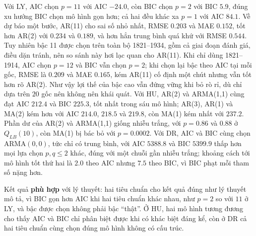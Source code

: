  Với LY, AIC chọn $p=11$ với AIC $-24.0$, còn BIC chọn $p=2$ với BIC $5.9$, đúng xu hướng BIC chọn mô hình gọn hơn; cả hai đều khác xa $p=1$ với AIC $84.1$. Về dự báo một bước, AR(11) cho sai số nhỏ nhất, RMSE $0.203$ và MAE $0.152$, tốt hơn AR(2) với $0.234$ và $0.189$, và hơn hẳn trung bình quá khứ với RMSE $0.544$. Tuy nhiên bậc 11 được chọn trên toàn bộ 1821--1934, gồm cả giai đoạn đánh giá, điều  dặn tránh, nên so sánh này hơi lạc quan cho AR(11). Khi chỉ dùng 1821--1914, AIC chọn $p=12$ và BIC vẫn chọn $p=2$; khi chọn lại bậc theo AIC tại mỗi gốc, RMSE là $0.209$ và MAE $0.165$, kém AR(11) cố định một chút nhưng vẫn tốt hơn rõ AR(2). Như vậy lợi thế của bậc cao vẫn đứng vững khi bỏ rò rỉ, dù chỉ dựa trên $20$ gốc nên không nên khái quát. Với HU, AR(2) và ARMA(1,1) cùng đạt AIC $212.4$ và BIC $225.3$, tốt nhất trong sáu mô hình; AR(3), AR(1) và MA(2) kém hơn với AIC $214.0$, $218.5$ và $219.8$, còn MA(1) kém nhất với $237.2$. Phần dư của AR(2) và ARMA(1,1) giống nhiễu trắng, với $p=0.86$ và $0.88$ ở $Q_{LB}(10)$, còn MA(1) bị bác bỏ với $p=0.0002$. Với DR, AIC và BIC cùng chọn ARMA$(0,0)$, tức chỉ có trung bình, với AIC $5388.8$ và BIC $5399.9$ thấp hơn mọi lựa chọn $p,q\le2$ khác, đúng với một chuỗi gần nhiễu trắng; khoảng cách tới mô hình tốt thứ hai là $2.0$ theo AIC nhưng $7.5$ theo BIC, vì BIC phạt mỗi tham số nặng hơn.

 Kết quả \textbf{phù hợp} với lý thuyết: hai tiêu chuẩn cho kết quả đúng như lý thuyết mô tả, vì BIC gọn hơn AIC khi hai tiêu chuẩn khác nhau, như $p=2$ so với $11$ ở LY, và bậc được chọn không phải bậc ``thật''. Ở HU, hai mô hình tương đương cho thấy AIC và BIC chỉ phân biệt được khi có khác biệt đáng kể, còn ở DR cả hai tiêu chuẩn cùng chọn đúng mô hình không có cấu trúc.

